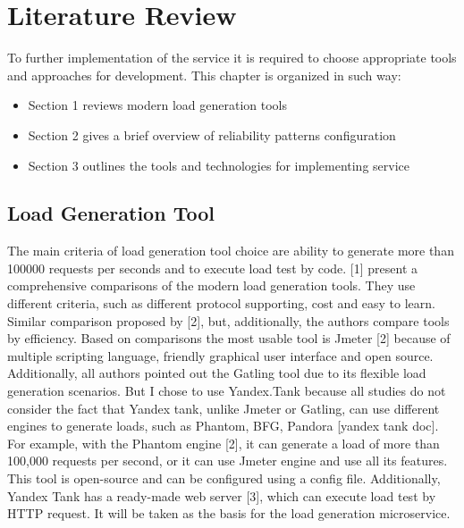 
\chapter{Literature Review}
\label{ch:lr}


To further implementation of the service it is required to choose appropriate tools and approaches for development.
This chapter is organized in such way:

\begin{itemize}
    \item Section 1 reviews modern load generation tools
    \item Section 2 gives a brief overview of reliability patterns configuration
    \item Section 3 outlines the tools and technologies for implementing service
\end{itemize}

\section{Load Generation Tool}\label{sec:load-generation}

The main criteria of load generation tool choice are ability to generate more than 100000 requests per seconds and to execute load test by code.
[1] present a comprehensive comparisons of the modern load generation tools.
They use different criteria, such as different protocol supporting, cost and easy to learn.
Similar comparison proposed by [2], but, additionally, the authors compare tools by efficiency.
Based on comparisons the most usable tool is Jmeter [2] because of multiple scripting language, friendly graphical user interface and open source.
Additionally, all authors pointed out the Gatling tool due to its flexible load generation scenarios.
But I chose to use Yandex.Tank because all studies do not consider the fact that Yandex tank, unlike Jmeter or Gatling, can use different engines to generate loads, such as Phantom, BFG, Pandora [yandex tank doc].
For example, with the Phantom engine [2], it can generate a load of more than 100,000 requests per second, or it can use Jmeter engine and use all its features.
This tool is open-source and can be configured using a config file.
Additionally, Yandex Tank has a ready-made web server [3], which can execute load test by HTTP request.
It will be taken as the basis for the load generation microservice.


